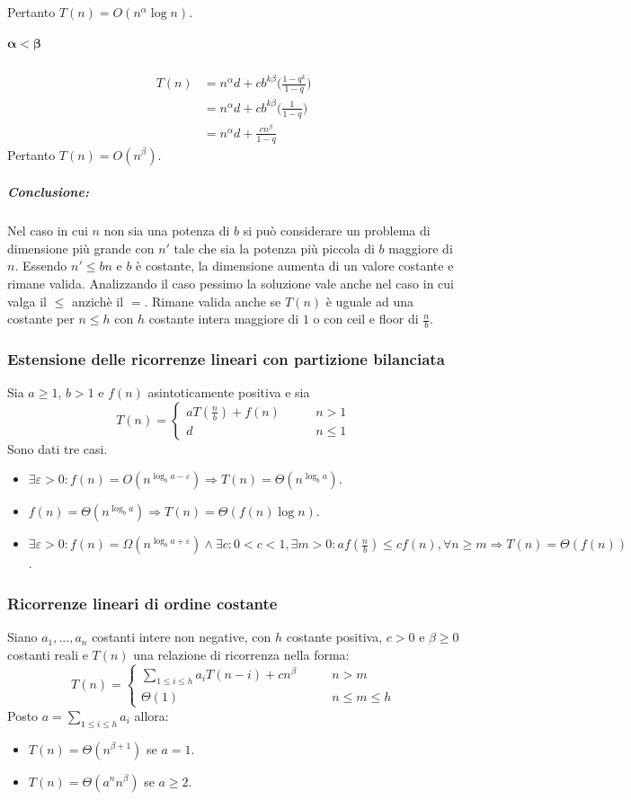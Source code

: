 Pertanto $T(n) = O(n^\alpha\log n)$.
\subparagraph{$\mathbf{\alpha<\beta}$}
\begin{align*}
	T(n) &= n^\alpha d + cb^{k\beta}\biggl(\frac{1-q^k}{1-q}\biggr)\\
	     &= n^\alpha d + cb^{k\beta}\biggl(\frac{1}{1-q}\biggr)\\
	     &=n^\alpha d + \frac{cn^\beta}{1-q}
\end{align*}
Pertanto $T(n) = O(n^\beta)$.
\subparagraph{Conclusione:} Nel caso in cui $n$ non sia una potenza di $b$ si pu\`o considerare un problema di dimensione pi\`u grande con $n'$ tale che sia la potenza pi\`u piccola di 
$b$ maggiore di $n$. Essendo $n'\le bn$ e $b$ \`e costante, la dimensione aumenta di un valore costante e rimane valida. Analizzando il caso pessimo la soluzione vale anche nel caso
in cui valga il $\le$ anzich\`e il $=$. Rimane valida anche se $T(n)$ \`e uguale ad una costante per $n\le h$ con $h$ costante intera maggiore di $1$ o con ceil e floor di $\frac{n}{b}$.
\subsubsection{Estensione delle ricorrenze lineari con partizione bilanciata}
Sia $a\ge 1$, $b>1$ e $f(n)$ asintoticamente positiva e sia 
\begin{equation*}
T(n)=
\begin{cases}
aT(\frac{n}{b})+f(n)\quad\quad & n>1\\
d & n\le 1
\end{cases}
\end{equation*}
Sono dati tre casi.
\begin{itemize}
\item $\exists \varepsilon >0: f(n)=O(n^{\log_ba-\varepsilon})\Rightarrow T(n)=\Theta(n^{\log_ba})$.
\item $f(n)=\Theta(n^{\log_ba})\Rightarrow T(n)=\Theta(f(n)\log n)$.
\item $\exists\varepsilon>0:f(n)=\Omega(n^{\log_ba+\varepsilon})\land \exists c:0<c<1, \exists m>0:af(\frac{n}{b})\le cf(n),\forall n\ge m\Rightarrow T(n)=
\Theta(f(n))$.
\end{itemize}
\subsubsection{Ricorrenze lineari di ordine costante}
Siano $a_1,\dots,a_n$ costanti intere non negative, con $h$ costante positiva, $c>0$ e $\beta\ge 0$ costanti reali e $T(n)$ una relazione di ricorrenza 
nella forma:
\begin{equation*}
T(n)=
\begin{cases}
\sum\limits_{1\le i\le h}a_iT(n-i)+cn^\beta\quad\quad& n>m\\
\Theta(1) & n\le m\le h
\end{cases}
\end{equation*}
Posto $a=\sum\limits_{1\le i\le h}a_i$ allora:
\begin{itemize}
\item $T(n)=\Theta(n^{\beta+1})$ se $a=1$.
\item $T(n)=\Theta(a^nn^{\beta})$ se $a\ge 2$.
\end{itemize}
